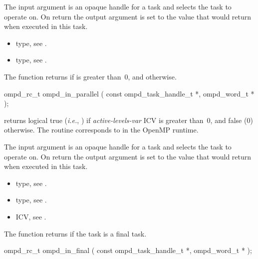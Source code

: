 \argdesc
The input argument  is an opaque handle for a task and selects the task to operate on.
On return the output argument  is set to the value that  would return when
executed in this task.

\crossreferences
\begin{itemize}
	\item {} type, see .
	\item {} type, see .
\end{itemize}


\label{ompd:ompd_in_parallel}
\summary
The  function returns  if  is greater than~0, and  otherwise.

\format
\cspecificstart
\begin{boxedcode}
ompd\_rc\_t ompd\_in\_parallel (
  const ompd\_task\_handle\_t  *,
  ompd\_word\_t  *
); 
\end{boxedcode}
\cspecificend

\descr
{} returns logical true (\textit{i.e.}, )
if \emph{active-levels-var}
ICV is greater than~0, and false (0) otherwise.
The routine corresponds to  in the OpenMP runtime.

\argdesc
The input argument  is an opaque handle for a task and selects the task to operate on.
On return the output argument  is set to the value that  would return when
executed in this task.

\crossreferences
\begin{itemize}
	\item {} type, see .
	\item {} type, see .
	\item {} ICV, see .
\end{itemize}


\label{ompd:ompd_in_final}
\summary
The  function returns  if the task is a final task.

\format
\cspecificstart
\begin{boxedcode}
ompd\_rc\_t ompd\_in\_final (
  const ompd\_task\_handle\_t  *,
  ompd\_word\_t   *
); 
\end{boxedcode}
\cspecificend

